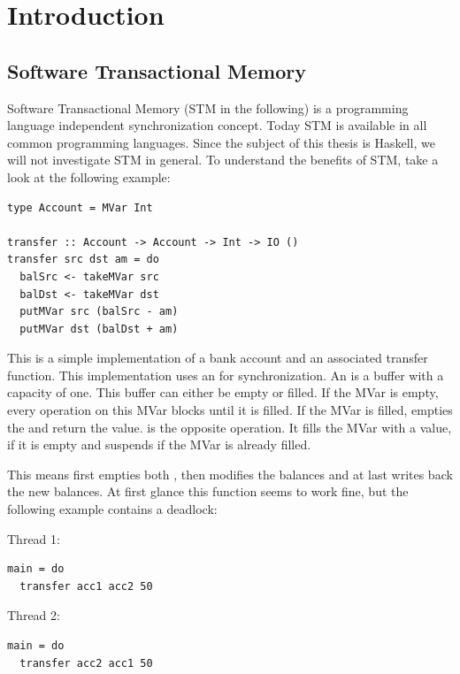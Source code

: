 
\chapter{Introduction} 

\label{Chapter1} 

\section{Software Transactional Memory}
\label{STMInterface}
Software Transactional Memory (STM in the following) is a programming language independent synchronization concept. Today STM is available 
in all common programming languages. Since the subject of this thesis is Haskell, we will not investigate STM in general.
To understand the benefits of STM, take a look at the following example:
\begin{lstlisting}
type Account = MVar Int

transfer :: Account -> Account -> Int -> IO ()
transfer src dst am = do
  balSrc <- takeMVar src
  balDst <- takeMVar dst
  putMVar src (balSrc - am)
  putMVar dst (balDst + am)
\end{lstlisting}
This is a simple implementation of a bank account and an associated transfer function. This implementation uses an 
for synchronization. An  is a buffer with a capacity of one. This buffer can either be empty or filled. If the MVar is empty,
every  operation on this MVar blocks until it is filled. If the MVar is filled,  empties the 
 and return the value.  is the opposite operation. It fills the MVar with a value, if it is empty and 
suspends if the MVar is already filled.

This means  first empties both , then modifies the balances and at last writes back the new balances.
At first glance this function seems to work fine, but the following example contains a deadlock:
\par\noindent
\begin{minipage}[t]{.45\textwidth}
Thread 1:
\begin{lstlisting}[frame=lrtb]
main = do
  transfer acc1 acc2 50
\end{lstlisting}
\end{minipage}
\hfill
\begin{minipage}[t]{.45\textwidth}
Thread 2:
\begin{lstlisting}[frame=lrtb]
main = do
  transfer acc2 acc1 50
\end{lstlisting}
\end{minipage}

